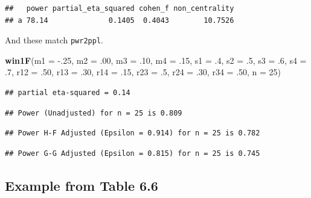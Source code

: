 \documentclass[]{book}
\newenvironment{Shaded}{\begin{snugshade}}{\end{snugshade}}
\newcommand{\DataTypeTok}[1]{\textcolor[rgb]{0.13,0.29,0.53}{#1}}
\newcommand{\DecValTok}[1]{\textcolor[rgb]{0.00,0.00,0.81}{#1}}
\newcommand{\FloatTok}[1]{\textcolor[rgb]{0.00,0.00,0.81}{#1}}
\newcommand{\KeywordTok}[1]{\textcolor[rgb]{0.13,0.29,0.53}{\textbf{#1}}}
\newcommand{\NormalTok}[1]{#1}
\begin{document}
\begin{verbatim}
##   power partial_eta_squared cohen_f non_centrality
## a 78.14              0.1405  0.4043        10.7526
\end{verbatim}

And these match \texttt{pwr2ppl}.

\begin{Shaded}
\begin{Highlighting}[]
\KeywordTok{win1F}\NormalTok{(}\DataTypeTok{m1 =} \FloatTok{-.25}\NormalTok{, }\DataTypeTok{m2 =} \FloatTok{.00}\NormalTok{, }\DataTypeTok{m3 =} \FloatTok{.10}\NormalTok{, }\DataTypeTok{m4 =} \FloatTok{.15}\NormalTok{,}
      \DataTypeTok{s1 =} \FloatTok{.4}\NormalTok{, }\DataTypeTok{s2 =} \FloatTok{.5}\NormalTok{, }\DataTypeTok{s3 =} \FloatTok{.6}\NormalTok{, }\DataTypeTok{s4 =} \FloatTok{.7}\NormalTok{,}
      \DataTypeTok{r12 =} \FloatTok{.50}\NormalTok{, }\DataTypeTok{r13 =} \FloatTok{.30}\NormalTok{,}
      \DataTypeTok{r14 =} \FloatTok{.15}\NormalTok{, }\DataTypeTok{r23 =} \FloatTok{.5}\NormalTok{,}
      \DataTypeTok{r24 =} \FloatTok{.30}\NormalTok{, }\DataTypeTok{r34 =} \FloatTok{.50}\NormalTok{,}
      \DataTypeTok{n =} \DecValTok{25}\NormalTok{)}
\end{Highlighting}
\end{Shaded}

\begin{verbatim}
## partial eta-squared = 0.14
\end{verbatim}

\begin{verbatim}
## Power (Unadjusted) for n = 25 is 0.809
\end{verbatim}

\begin{verbatim}
## Power H-F Adjusted (Epsilon = 0.914) for n = 25 is 0.782
\end{verbatim}

\begin{verbatim}
## Power G-G Adjusted (Epsilon = 0.815) for n = 25 is 0.745
\end{verbatim}

\hypertarget{example-from-table-6.6}{%
\subsection{Example from Table 6.6}\label{example-from-table-6.6}}
\end{document}
